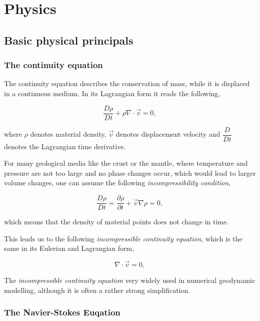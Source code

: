 
\section{Physics}

\subsection{Basic physical principals}

\subsubsection{The continuity equation}

The continuity equation describes the conservation of mass, while it is displaced in a continuous medium. In its Lagrangian form it reads the following,

\begin{equation}\label{eqs:cont_general}
\dfrac{D \rho}{D t} + \rho \nabla\cdot\vec{v} = 0,
\end{equation}

where $\rho$ denotes material density, $\vec{v}$ denotes displacement velocity and $\dfrac{D}{D t}$ denotes the Lagrangian time derivative.

For many geological media like the crust or the mantle, where temperature and pressure are not too large and no phase changes occur, which would lead to larger volume changes, one can assume the following \textit{incompressibility condition},

\begin{equation}\label{eqs:imcompress}
\dfrac{D \rho}{D t} = \dfrac{\partial \rho}{\partial t} +\vec{v} \nabla\rho = 0,
\end{equation}

which means that the density of material points does not change in time.

This leads us to the following \textit{incompressible continuity equation}, which is the same in its Eulerian and Lagrangian form,

\begin{equation}
\nabla\cdot\vec{v}=0,
\end{equation}

The \textit{incompressible continuity equation} very widely used in numerical geodynamic modelling, although it is often a rather strong simplification.

\subsubsection{The Navier-Stokes Euqation}

